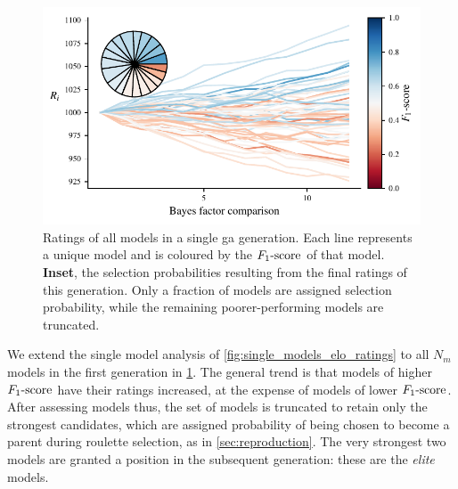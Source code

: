\par 
\begin{figure}
    \begin{center}
        \includegraphics{theoretical_study/figures/single_generation_all_ratings.pdf}
    \end{center}
    \caption[Ratings of all models in a single \gls{ga} generation.]{
        Ratings of all models in a single \gls{ga} generation.
        Each line represents a unique model and is coloured by the $ F_{1}\text{-score} $ of that model. 
        \textbf{Inset}, the selection probabilities resulting from the final ratings of this generation. 
        Only a fraction of models are assigned selection probability, while the remaining poorer-performing 
        models are truncated. 
    }
    \label{fig:single_generation_all_ratings}
\end{figure}

We extend the single model analysis of \cref{fig:single_models_elo_ratings} to all $N_m$ models 
    in the first generation in \cref{fig:single_generation_all_ratings}.
The general trend is that models of higher $ F_{1}\text{-score} $ have their ratings increased, 
    at the expense of models of lower $ F_{1}\text{-score} $. 
After assessing models thus, the set of models is truncated to retain only the strongest candidates,
    which are assigned probability of being chosen to become a parent during roulette selection, 
    as in \cref{sec:reproduction}.
The very strongest two models are granted a position in the subsequent generation: 
    these are the \emph{elite} models. 

